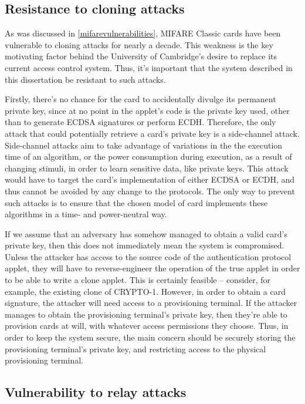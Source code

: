 \documentclass[12pt,a4paper,twoside,openright]{report}
\begin{document}
\subsection{Resistance to cloning attacks}

As was discussed in \autoref{mifarevulnerabilities}, MIFARE Classic cards have been vulnerable to cloning attacks for nearly a decade. This weakness is the key motivating factor behind the University of Cambridge's desire to replace its current access control system. Thus, it's important that the system described in this dissertation be resistant to such attacks.

Firstly, there's no chance for the card to accidentally divulge its permanent private key, since at no point in the applet's code is the private key used, other than to generate ECDSA signatures or perform ECDH. Therefore, the only attack that could potentially retrieve a card's private key is a side-channel attack. Side-channel attacks aim to take advantage of variations in the the execution time of an algorithm, or the power consumption during execution, as a result of changing stimuli, in order to learn sensitive data, like private keys. This attack would have to target the card's implementation of either ECDSA or ECDH, and thus cannot be avoided by any change to the protocols. The only way to prevent such attacks is to ensure that the chosen model of card implements these algorithms in a time- and power-neutral way.

If we assume that an adversary has somehow managed to obtain a valid card's private key, then this does not immediately mean the system is compromised. Unless the attacker has access to the source code of the authentication protocol applet, they will have to reverse-engineer the operation of the true applet in order to be able to write a clone applet. This is certainly feasible -- consider, for example, the existing clone of CRYPTO-1. However, in order to obtain a card signature, the attacker will need access to a provisioning terminal. If the attacker manages to obtain the provisioning terminal's private key, then they're able to provision cards at will, with whatever access permissions they choose. Thus, in order to keep the system secure, the main concern should be securely storing the provisioning terminal's private key, and restricting access to the physical provisioning terminal.

\subsection{Vulnerability to relay attacks}
\end{document}
